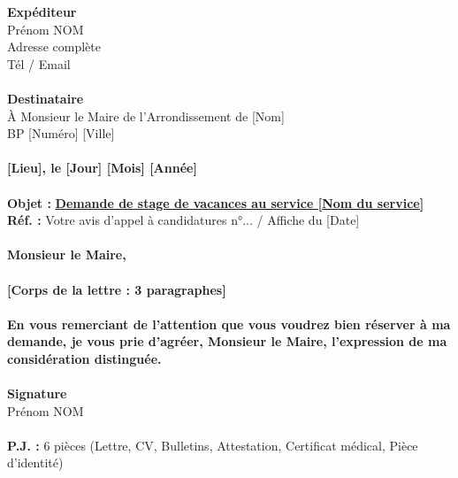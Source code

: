 \documentclass[11pt]{article}
\begin{document}
\begin{aretenir}
\textbf{Expéditeur} \\
Prénom NOM \\
Adresse complète \\
Tél / Email \\
\\
\textbf{Destinataire} \\
À Monsieur le Maire de l'Arrondissement de [Nom] \\
BP [Numéro] [Ville] \\
\\
\textbf{[Lieu], le [Jour] [Mois] [Année]} \\
\\
\textbf{Objet :} \textbf{\underline{Demande de stage de vacances au service [Nom du service]}} \\
\textbf{Réf. :} Votre avis d'appel à candidatures n°... / Affiche du [Date] \\
\\
\textbf{Monsieur le Maire,} \\
\\
\textbf{[Corps de la lettre : 3 paragraphes]} \\
\\
\textbf{En vous remerciant de l'attention que vous voudrez bien réserver à ma demande, je vous prie d'agréer, Monsieur le Maire, l'expression de ma considération distinguée.} \\
\\
\textbf{Signature} \\
Prénom NOM \\
\\
\textbf{P.J. :} 6 pièces (Lettre, CV, Bulletins, Attestation, Certificat médical, Pièce d'identité)
\end{aretenir}
\end{document}

